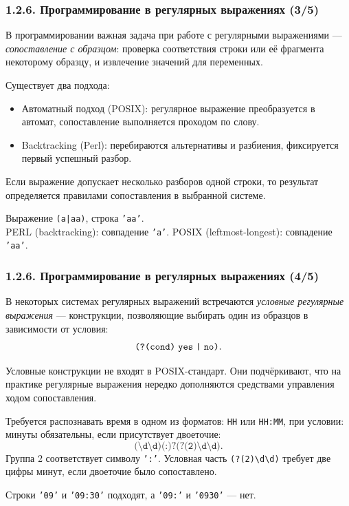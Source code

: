 \documentclass[mathserif,12pt,aspectratio=169]{beamer}
\renewcommand{\index}[1]{}
\def\odmkey#1#2{{\it\color{red} #1}\index{#2}}
\begin{document}
\begin{frame}
\frametitle{1.2.6. Программирование в регулярных выражениях (3/5)}
В программировании важная задача при работе с регулярными выражениями ---
\odmkey{сопоставление с образцом}{Сопоставление с образцом}:
проверка соответствия строки или её фрагмента некоторому образцу,
и извлечение значений для переменных.

\smallskip
Существует два подхода:
\begin{itemize}
\item Автоматный подход (POSIX): регулярное выражение
преобразуется в автомат, сопоставление выполняется проходом по слову.

\item Backtracking (Perl): перебираются
альтернативы и разбиения, фиксируется первый успешный разбор.
\end{itemize}

\begin{remark}
Если выражение допускает несколько разборов одной строки, то результат
определяется правилами сопоставления в выбранной системе.
\end{remark}

\begin{example}
Выражение \texttt{(a|aa)}, строка \texttt{'aa'}.\\
PERL (backtracking): совпадение \texttt{'a'}.
POSIX (leftmost-longest): совпадение \texttt{'aa'}.
\end{example}
\end{frame}


\begin{frame}
\frametitle{1.2.6. Программирование в регулярных выражениях (4/5)}
В некоторых системах регулярных выражений встречаются
\odmkey{условные регулярные выражения}{Условные регулярные выражения} ---
конструкции, позволяющие выбирать один из образцов в зависимости от условия:
\[
\texttt{(?(cond)\;yes\;|\;no)}.
\]

\begin{remark}
Условные конструкции не входят в POSIX-стандарт.
Они подчёркивают, что на практике регулярные выражения нередко дополняются
средствами управления ходом сопоставления.
\end{remark}

\begin{example}
Требуется распознавать время в одном из форматов: \texttt{HH} или \texttt{HH:MM},
при условии: минуты обязательны, если присутствует двоеточие:
\[
\texttt{(\textbackslash d\textbackslash d)(:)?(?(2)\textbackslash d\textbackslash d)}.
\]
Группа 2 соответствует символу \texttt{':'}.
Условная часть \texttt{(?(2)\textbackslash d\textbackslash d)} требует две цифры минут, если двоеточие было сопоставлено.

\smallskip
Строки \texttt{'09'} и \texttt{'09:30'} подходят, а \texttt{'09:'} и \texttt{'0930'} --- нет.
\end{example}
\end{frame}
\end{document}
